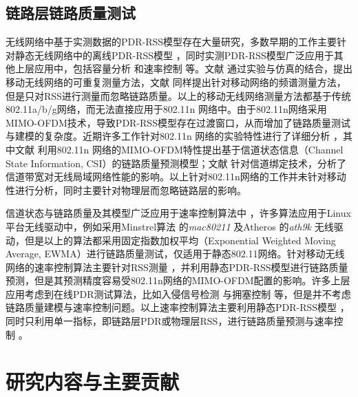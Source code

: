 \subsection{链路层链路质量测试}
\label{sec:mac}

无线网络中基于实测数据的PDR-RSS模型存在大量研究，多数早期的工作主要针对静态无线网络中的离线PDR-RSS模型 \cite{kolar2011mesh} \cite{reis2006model}，同时实测PDR-RSS模型广泛应用于其他上层应用中，包括容量分析 \cite{kashyap2007capacity} 和速率控制 \cite{chen2011ram} \cite{judd2008efficient} 等。文献 \cite{10.1109/TMC.2009.87} 通过实验与仿真的结合，提出移动无线网络的可重复测量方法，文献 \cite{kim2010sybot} 同样提出针对移动网络的频谱测量方法，但是只对RSS进行测量而忽略链路质量。以上的移动无线网络测量方法都基于传统802.11a/b/g网络，而无法直接应用于802.11n 网络中。由于802.11n网络采用MIMO-OFDM技术，导致PDR-RSS模型存在过渡窗口，从而增加了链路质量测试与建模的复杂度。近期许多工作针对802.11n 网络的实验特性进行了详细分析 \cite{Halperin2010predictable} \cite{k.rayanchu:fluid:}，其中文献 \cite{Halperin2010predictable} 利用802.11n 网络的MIMO-OFDM特性提出基于信道状态信息（Channel State Information, CSI）的链路质量预测模型；文献 \cite{k.rayanchu:fluid:} 针对信道绑定技术，分析了信道带宽对无线局域网络性能的影响。以上针对802.11n网络的工作并未针对移动性进行分析，同时主要针对物理层而忽略链路层的影响。

信道状态与链路质量及其模型广泛应用于速率控制算法中 \cite{kim2009experimental} \cite{Pefkianakis:2010} \cite{zhang2008practical} \cite{Li:2012:ERA:2348543.2348585}，许多算法应用于Linux平台无线驱动中，例如采用Minstrel算法 \cite{minstrel} 的\textit{mac80211} 及Atheros \cite{wong2008wireless}的\textit{ath9k} 无线驱动，但是以上的算法都采用固定指数加权平均（Exponential Weighted Moving Average, EWMA）进行链路质量测试，仅适用于静态802.11网络。针对移动无线网络的速率控制算法主要针对RSS测量 \cite{chen2011ram} \cite{judd2008efficient}，并利用静态PDR-RSS模型进行链路质量预测，但是其预测精度容易受802.11n网络的MIMO-OFDM配置的影响。许多上层应用考虑到在线PDR测试算法，比如入侵信号检测 \cite{5620919} 与拥塞控制 \cite{floyd2000equation} 等，但是并不考虑链路质量建模与速率控制问题。以上速率控制算法主要利用静态PDR-RSS模型 \cite{kashyap2007capacity} \cite{kolar2011mesh} \cite{reis2006model}，同时只利用单一指标，即链路层PDR或物理层RSS，进行链路质量预测与速率控制 \cite{judd2008efficient} \cite{zhang2008practical}。

\section{研究内容与主要贡献}

